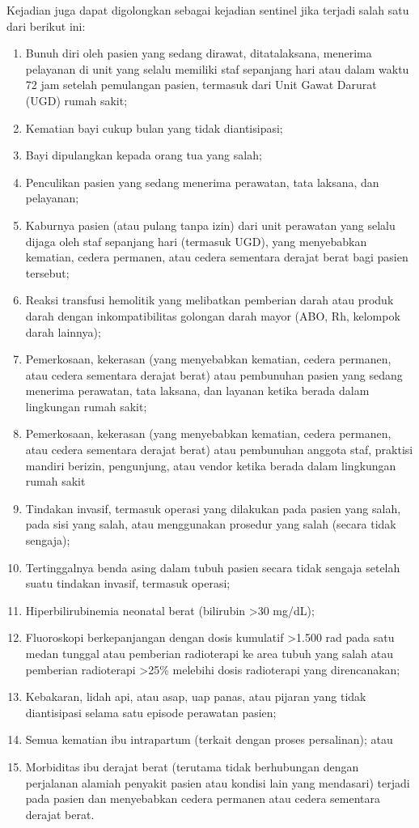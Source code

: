 \documentclass[
]{book}
\providecommand{\tightlist}{%
  \setlength{\itemsep}{0pt}\setlength{\parskip}{0pt}}
\begin{document}
Kejadian juga dapat digolongkan sebagai kejadian sentinel jika terjadi salah satu dari berikut ini:

\begin{enumerate}
\def\labelenumi{\alph{enumi}.}
\tightlist
\item
  Bunuh diri oleh pasien yang sedang dirawat, ditatalaksana, menerima pelayanan di unit yang selalu memiliki staf sepanjang hari atau dalam waktu 72 jam setelah pemulangan pasien, termasuk dari Unit Gawat Darurat (UGD) rumah sakit;
\item
  Kematian bayi cukup bulan yang tidak diantisipasi;
\item
  Bayi dipulangkan kepada orang tua yang salah;
\item
  Penculikan pasien yang sedang menerima perawatan, tata laksana, dan pelayanan;
\item
  Kaburnya pasien (atau pulang tanpa izin) dari unit perawatan yang selalu dijaga oleh staf sepanjang hari (termasuk UGD), yang menyebabkan kematian, cedera permanen, atau cedera sementara derajat berat bagi pasien tersebut;
\item
  Reaksi transfusi hemolitik yang melibatkan pemberian darah atau produk darah dengan inkompatibilitas golongan darah mayor (ABO, Rh, kelompok darah lainnya);
\item
  Pemerkosaan, kekerasan (yang menyebabkan kematian, cedera permanen, atau cedera sementara derajat berat) atau pembunuhan pasien yang sedang menerima perawatan, tata laksana, dan layanan ketika berada dalam lingkungan rumah sakit;
\item
  Pemerkosaan, kekerasan (yang menyebabkan kematian, cedera permanen, atau cedera sementara derajat berat) atau pembunuhan anggota staf, praktisi mandiri berizin, pengunjung, atau vendor ketika berada dalam lingkungan rumah sakit
\item
  Tindakan invasif, termasuk operasi yang dilakukan pada pasien yang salah, pada sisi yang salah, atau menggunakan prosedur yang salah (secara tidak sengaja);
\item
  Tertinggalnya benda asing dalam tubuh pasien secara tidak sengaja setelah suatu tindakan invasif, termasuk operasi;
\item
  Hiperbilirubinemia neonatal berat (bilirubin \textgreater30 mg/dL);
\item
  Fluoroskopi berkepanjangan dengan dosis kumulatif
  \textgreater1.500 rad pada satu medan tunggal atau pemberian radioterapi ke area tubuh yang salah atau pemberian radioterapi \textgreater25\% melebihi dosis radioterapi yang direncanakan;
\item
  Kebakaran, lidah api, atau asap, uap panas, atau pijaran yang tidak diantisipasi selama satu episode perawatan pasien;
\item
  Semua kematian ibu intrapartum (terkait dengan proses persalinan); atau
\item
  Morbiditas ibu derajat berat (terutama tidak berhubungan dengan perjalanan alamiah penyakit pasien atau kondisi lain yang mendasari) terjadi pada pasien dan menyebabkan cedera permanen atau cedera sementara derajat berat.
\end{enumerate}
\end{document}
